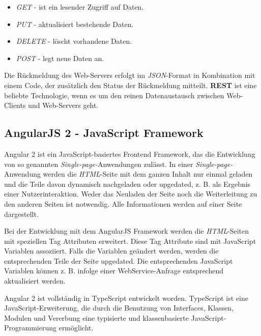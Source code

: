 \begin{itemize}

\item \textit{GET} - ist ein lesender Zugriff auf Daten.
\item \textit{PUT} - aktualisiert bestehende Daten.
\item \textit{DELETE} - löscht vorhandene Daten.
\item \textit{POST} - legt neue Daten an.

\end{itemize} 

Die Rückmeldung des Web-Servers erfolgt im \textit{JSON}-Format in Kombination mit einem Code, der zusätzlich den Status der Rückmeldung mitteilt.
\textbf{REST} ist eine beliebte Technologie, wenn es um den reinen Datenaustausch zwischen Web-Clients und Web-Servers geht. 

\subsection{AngularJS 2 - JavaScript Framework}
Angular 2 ist ein JavaScript-basiertes Frontend Framework, das die Entwicklung von so genannten \textit{Single-page-}Anwendungen zulässt. In einer \textit{Single-page-}Anwendung werden die \textit{HTML}-Seite mit dem ganzen Inhalt nur einmal geladen und die Teile davon dynamisch nachgeladen oder upgedated, z. B. als Ergebnis einer Nutzerinteraktion. Weder das Neuladen der Seite noch die Weiterleitung zu den anderen Seiten ist notwendig. Alle Informationen werden auf einer Seite dargestellt. 

Bei der Entwicklung mit dem AngularJS Framework werden die \textit{HTML}-Seiten mit speziellen Tag Attributen erweitert. Diese Tag Attribute sind mit JavaScript Variablen assoziiert. Falls die Variablen geändert werden, werden die entsprechenden Teile der Seite upgedated. Die entsprechenden JavaScript Variablen können z. B. infolge einer WebService-Anfrage entsprechend aktualisiert werden. 

Angular 2 ist vollständig in TypeScript entwickelt worden. TypeScript ist eine JavaScript-Erweiterung, die durch die Benutzung von Interfaces, Klassen, Modulen und Vererbung eine typisierte und klassenbasierte JavaScript-Programmierung ermöglicht. \cite{typescript}

